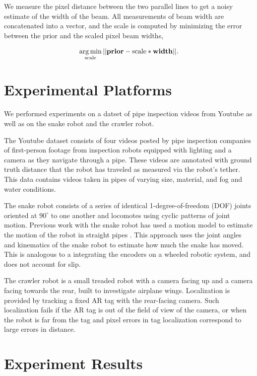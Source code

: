 \documentclass[letterpaper, 10 pt, conference]{ieeeconf}
\DeclareMathOperator*{\argmin}{arg\,min}
\begin{document}
We measure the pixel distance between the two parallel lines to get a noisy estimate of the width of the beam. All measurements of beam width are concatenated into a vector, and the scale is computed by minimizing the error between the prior and the scaled pixel beam widths,

\begin{equation}
	\argmin_{\textrm{scale}} || \textbf{\textrm{prior}} - \textrm{scale} * \textbf{\textrm{width}} ||.
\end{equation}


\section{Experimental Platforms}

We performed experiments on a datset of pipe inspection videos from Youtube as well as on the snake robot and the crawler robot.

The Youtube dataset consists of four videos \cite{pipevideo2, pipevideo4, pipevideo5, pipevideo6} posted by pipe inspection companies of first-person footage from inspection robots equipped with lighting and a camera as they navigate through a pipe. These videos are annotated with ground truth distance that the robot has traveled as measured via the robot's tether. This data contains videos taken in pipes of varying size, material, and fog and water conditions.

The snake robot \cite{Wright2012} consists of a series of identical 1-degree-of-freedom (DOF) joints oriented at $90^{\circ}$ to one another and locomotes using cyclic patterns of joint motion. Previous work with the snake robot has used a motion model \cite{Enner2012} to estimate the motion of the robot in straight pipes \cite{Enner2013}. This approach uses the joint angles and kinematics of the snake robot to estimate how much the snake has moved. This is analogous to a integrating the encoders on a wheeled robotic system, and does not account for slip.

The crawler robot is a small treaded robot with a camera facing up and a camera facing towards the rear, built to investigate airplane wings. Localization is provided by tracking a fixed AR tag with the rear-facing camera. Such localization fails if the AR tag is out of the field of view of the camera, or when the robot is far from the tag and pixel errors in tag localization correspond to large errors in distance.

\section{Experiment Results}
\end{document}

